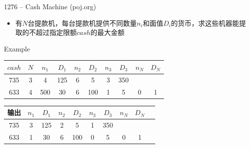 \begin{frame}{1276 -- Cash Machine (poj.org)}
    \begin{itemize}
        \item 有$N$台提款机，每台提款机提供不同数量$n_i$和面值$D_i$的货币，求这些机器能提取的不超过指定限额$cash$的最大金额
    \end{itemize}
    \vfill
    \begin{exampleblock}{Example}
        \begin{table}
            \begin{tabular}{cccccccccc}
                $cash$ & $N$    & $n_1$   & $D_1$   & $n_2$   & $D_2$   & $n_3$   & $D_3$   & $n_N$   & $D_N$  \\\hline
                735  & 3    & 4    & 125  & 6    & 5    & 3    & 350  &      &    \\\hline
                633  & 4    & 500  & 30   & 6    & 100  & 1    & 5    & 0    & 1  \\\hline
            \end{tabular}
        \end{table}
        \begin{table}
            \begin{tabular}{cccccccccc}
                输出 & $n_1$   & $D_1$   & $n_2$   & $D_2$   & $n_3$   & $D_3$   & $n_N$   & $D_N$  \\\hline
                735  & 3  & 125  & 2    & 5    & 1    & 350  &      &    \\\hline
                633  & 1  & 30   & 6    & 100  & 0    & 5    & 0    & 1  \\\hline
            \end{tabular}
        \end{table}
        
    \end{exampleblock}
\end{frame}  


